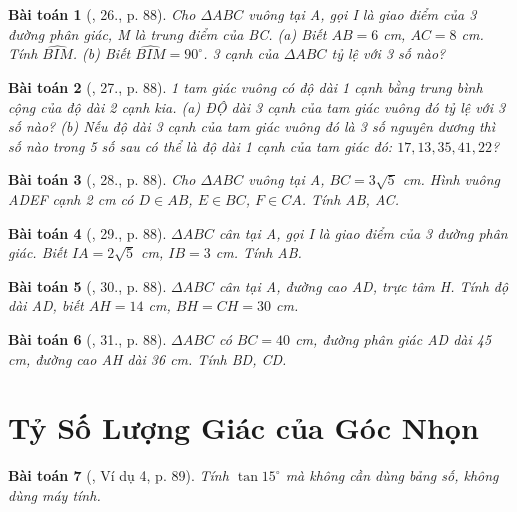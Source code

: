 \documentclass{article}
\newtheorem{baitoan}{Bài toán}
\begin{document}
\begin{baitoan}[\cite{Binh_Toan_9_tap_1}, 26., p. 88]
	Cho $\Delta ABC$ vuông tại A, gọi I là giao điểm của 3 đường phân giác, M là trung điểm của BC. (a) Biết $AB = 6$ {\rm cm}, $AC = 8$ {\rm cm}. Tính $\widehat{BIM}$. (b) Biết $\widehat{BIM} = 90^\circ$. 3 cạnh của $\Delta ABC$ tỷ lệ với 3 số nào?
\end{baitoan}

\begin{baitoan}[\cite{Binh_Toan_9_tap_1}, 27., p. 88]
	1 tam giác vuông có độ dài 1 cạnh bằng trung bình cộng của độ dài 2 cạnh kia. (a) ĐỘ dài 3 cạnh của tam giác vuông đó tỷ lệ với 3 số nào? (b) Nếu độ dài 3 cạnh của tam giác vuông đó là 3 số nguyên dương thì số nào trong 5 số sau có thể là độ dài 1 cạnh của tam giác đó: $17,13,35,41,22$?
\end{baitoan}

\begin{baitoan}[\cite{Binh_Toan_9_tap_1}, 28., p. 88]
	Cho $\Delta ABC$ vuông tại A, $BC = 3\sqrt{5}$ {\rm cm}. Hình vuông ADEF cạnh {\rm2 cm} có $D\in AB$, $E\in BC$, $F\in CA$. Tính AB, AC.
\end{baitoan}

\begin{baitoan}[\cite{Binh_Toan_9_tap_1}, 29., p. 88]
	$\Delta ABC$ cân tại A, gọi I là giao điểm của 3 đường phân giác. Biết $IA = 2\sqrt{5}$ {\rm cm}, $IB = 3$ {\rm cm}. Tính AB.
\end{baitoan}

\begin{baitoan}[\cite{Binh_Toan_9_tap_1}, 30., p. 88]
	$\Delta ABC$ cân tại A, đường cao AD, trực tâm H. Tính độ dài AD, biết $AH = 14$ {\rm cm}, $BH = CH = 30$ {\rm cm}.
\end{baitoan}

\begin{baitoan}[\cite{Binh_Toan_9_tap_1}, 31., p. 88]
	$\Delta ABC$ có $BC = 40$ {\rm cm}, đường phân giác AD dài {\rm45 cm}, đường cao AH dài {\rm36 cm}. Tính BD, CD.
\end{baitoan}


\section{Tỷ Số Lượng Giác của Góc Nhọn}

\begin{baitoan}[\cite{Binh_Toan_9_tap_1}, Ví dụ 4, p. 89]
	Tính $\tan15^\circ$ mà không cần dùng bảng số, không dùng máy tính.
\end{baitoan}
\end{document}
